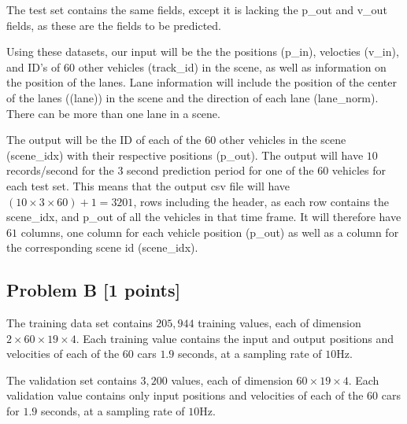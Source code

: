 \documentclass{article}
\begin{document}
        The test set contains the same fields, except it is lacking the {\selectfont p\_out} and
        {\selectfont v\_out} fields, as these are the fields to be predicted. 
        
        Using these datasets, our input will be the the positions ({\selectfont p\_in}), velocties 
        ({\selectfont v\_in}), and ID's of $60$ other vehicles ({\selectfont track\_id}) 
        in the scene, as well as information on the position of the lanes. Lane information will include the position
        of the center of the lanes (({\selectfont lane})) in the scene and the direction of each lane 
        ({\selectfont lane\_norm}). There can be more than one lane in a scene.

        The output will be the ID of each of the $60$ other vehicles in the scene ({\selectfont scene\_idx}) 
        with their respective positions ({\selectfont p\_out}). The output will have $10$ records/second 
        for the $3$ second prediction period for one of the $60$ vehicles for each test set. This means that the output csv file will have 
        $\left( 10 \times 3 \times 60 \right) + 1 = 3201$,
        rows including the header, as each row contains the {\selectfont scene\_idx}, and 
        {\selectfont p\_out} of all the vehicles in that time frame. 
        It will therefore have $61$ columns, one column for each vehicle position ({\selectfont p\_out})
        as well as a column for the corresponding scene id ({\selectfont scene\_idx}).



    \subsection{Problem B [1 points]}        

        The training data set contains $205,944$ training values, each of dimension
        $2 \times 60 \times 19 \times 4$. Each training value contains the input and output positions
        and velocities of each of the $60$ cars $1.9$ seconds, at a sampling rate of $10\mathrm{Hz}$.

        The validation set contains $3,200$ values, each of dimension
        $60 \times 19 \times 4$. Each validation value contains only input positions
        and velocities of each of the $60$ cars for $1.9$ seconds, at a sampling rate of $10\mathrm{Hz}$.
\end{document}
